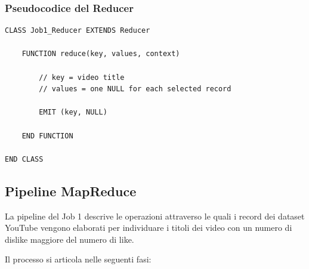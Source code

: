 \documentclass[12pt, a4paper]{article}
\begin{document}
\subsubsection{Pseudocodice del Reducer}

\begin{verbatim}
CLASS Job1_Reducer EXTENDS Reducer

    FUNCTION reduce(key, values, context)

        // key = video title
        // values = one NULL for each selected record

        EMIT (key, NULL)

    END FUNCTION

END CLASS
\end{verbatim}

\subsection{Pipeline MapReduce}

La pipeline del Job 1 descrive le operazioni
attraverso le quali i record dei dataset YouTube
vengono elaborati per individuare i titoli
dei video con un numero di dislike
maggiore del numero di like.

Il processo si articola nelle seguenti fasi:
\end{document}
